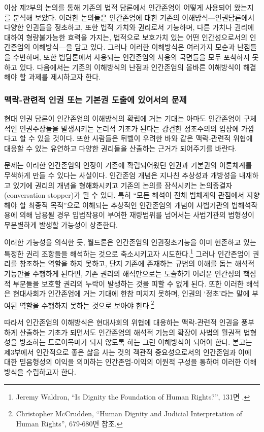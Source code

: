 이상 제2부의 논의를 통해 기존의 법적 담론에서 인간존엄이 어떻게 사용되어 왔는지를 분석해 보았다. 이러한 논의들은 인간존엄에 대한 기존의 이해방식---인권담론에서 다양한 인권들을 정초하고, 또한 법적 가치와 권리로서 기능하며, 다른 가치나 권리에 대하여 형량불가능한 효력을 가지는, 법적으로 보호가치 있는 어떤 인간성으로서의 인간존엄의 이해방식---을 담고 있다. 그러나 이러한 이해방식은 여러가지 모순과 난점들을 수반하며, 또한 법담론에서 사용되는 인간존엄의 사용의 국면들을 모두 포착하지 못하고 있다. 다음에서는 기존의 이해방식의 난점과 인간존엄의 올바른 이해방식이 해결해야 할 과제를 제시하고자 한다.

\subsubsection{맥락-관련적 인권 또는 기본권 도출에 있어서의 문제}

현대 인권 담론이 인간존엄의 이해방식의 확립에 거는 기대는 아마도 인간존엄이 구체적인 인권주장들을 발생시키는 논리적 기초가 된다는 강건한 정초주의의 입장에 가깝다고 할 수 있을 것이다. 또한 사람들은 뒤벨이 우려한 바와 같은 맥락-관련적 위협에 대응할 수 있는 유연하고 다양한 권리들을 산출하는 근거가 되어주기를 바란다.

문제는 이러한 인간존엄의 인정이 기존에 확립되어왔던 인권과 기본권의 이론체계를 무색하게 만들 수 있다는 사실이다. 인간존엄 개념은 지나친 추상성과 개방성을 내재하고 있기에 권리의 개념을 형해화시키고 기존의 논의를 잠식시키는 논의종결자(conversation stopper)가 될 수 있다. 특히 ``모든 해석이 전체 법체계의 관점에서 지향해야 할 최종적 목적''으로 이해되는 추상적인 인간존엄의 개념이 사법기관의 법해석작용에 의해 남용될 경우 입법작용이 부여한 재량범위를 넘어서는 사법기관의 법형성이 무분별하게 발생할 가능성이 상존한다.

이러한 가능성을 의식한 듯, 월드론은 인간존엄의 인권정초기능을 이미 현존하고 있는 특정한 권리 조항들을 해석하는 것으로 축소시키고자 시도한다.\footnote{Jeremy Waldron, ``Is Dignity the Foundation of Human Rights?'', 131면 .} 그러나 인간존엄이 권리를 창조하는 역할을 하지 못하고, 단지 기존에 존재하는 규범의 이해를 돕는 해석적 기능만을 수행하게 된다면, 기존 권리의 해석만으로는 도출하기 어려운 인간성의 핵심적 부분들을 보호할 권리의 누락이 발생하는 것을 피할 수 없게 된다. 또한 이러한 해석은 현대사회가 인간존엄에 거는 기대에 한참 미치지 못하며, 인권의 `정초'라는 말에 부여된 역할을 수행하지 못하는 것으로 보아야 한다.\footnote{Christopher McCrudden, ``Human Dignity and Judicial Interpretation of Human Rights'', 679-680면 참조.}

따라서 인간존엄의 이해방식은 현대사회의 위협에 대응하는 맥락-관련적 인권을 풍부하게 산출하는 기초가 되면서도 인간존엄의 해석적 기능의 확장이 사법의 월권적 법형성을 방조하는 트로이목마가 되지 않도록 하는 그런 이해방식이 되어야 한다. 본고는 제3부에서 인간적으로 좋은 삶을 사는 것의 객관적 중요성으로서의 인간존엄과 이에 대한 믿음형성의 이익을 의미하는 인간존엄-이익의 이원적 구성을 통하여 이러한 이해방식을 수립하고자 한다.

